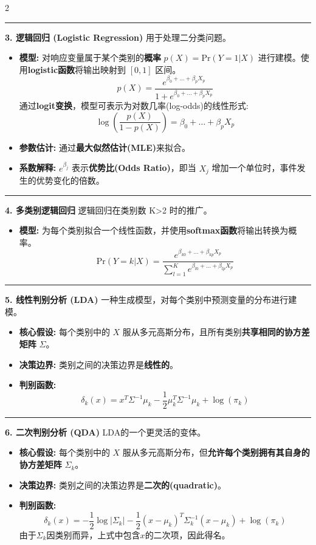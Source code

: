 \documentclass[9pt,a4paper]{article} %
\newcommand{\mysection}[1]{\vspace{0.5em}\hrule\vspace{0.3em}\noindent\textbf{\large #1}\vspace{0.1em}}
\begin{document}
\begin{multicols}{2}
\begin{itemize}
\mysection{3. 逻辑回归 (Logistic Regression)}
用于处理二分类问题。
\begin{itemize}
    \item \textbf{模型:} 对响应变量属于某个类别的\textbf{概率} $p(X) = \text{Pr}(Y=1|X)$ 进行建模。使用\textbf{logistic函数}将输出映射到 $[0, 1]$ 区间。
    $$ p(X) = \frac{e^{\beta_0 + \dots + \beta_pX_p}}{1 + e^{\beta_0 + \dots + \beta_pX_p}} $$
    通过\textbf{logit变换}，模型可表示为对数几率(log-odds)的线性形式:
    $$ \log\left(\frac{p(X)}{1-p(X)}\right) = \beta_0 + \dots + \beta_pX_p $$
    \item \textbf{参数估计:} 通过\textbf{最大似然估计(MLE)}来拟合。
    \item \textbf{系数解释:} $e^{\beta_j}$ 表示\textbf{优势比(Odds Ratio)}，即当 $X_j$ 增加一个单位时，事件发生的优势变化的倍数。
\end{itemize}

\mysection{4. 多类别逻辑回归}
逻辑回归在类别数 K>2 时的推广。
\begin{itemize}
    \item \textbf{模型:} 为每个类别拟合一个线性函数，并使用\textbf{softmax函数}将输出转换为概率。
    $$ \text{Pr}(Y=k|X) = \frac{e^{\beta_{k0} + \dots + \beta_{kp}X_p}}{\sum_{l=1}^{K} e^{\beta_{l0} + \dots + \beta_{lp}X_p}} $$
\end{itemize}

\mysection{5. 线性判别分析 (LDA)}
一种生成模型，对每个类别中预测变量的分布进行建模。
\begin{itemize}
    \item \textbf{核心假设:} 每个类别中的 $X$ 服从多元高斯分布，且所有类别\textbf{共享相同的协方差矩阵} $\Sigma$。
    \item \textbf{决策边界:} 类别之间的决策边界是\textbf{线性的}。
    \item \textbf{判别函数:}
    $$ \delta_k(x) = x^T\Sigma^{-1}\mu_k - \frac{1}{2}\mu_k^T\Sigma^{-1}\mu_k + \log(\pi_k) $$
\end{itemize}

\mysection{6. 二次判别分析 (QDA)}
LDA的一个更灵活的变体。
\begin{itemize}
    \item \textbf{核心假设:} 每个类别中的 $X$ 服从多元高斯分布，但\textbf{允许每个类别拥有其自身的协方差矩阵} $\Sigma_k$。
    \item \textbf{决策边界:} 类别之间的决策边界是\textbf{二次的(quadratic)}。
    \item \textbf{判别函数:}
    $$ \delta_k(x) = -\frac{1}{2}\log|\Sigma_k| - \frac{1}{2}(x-\mu_k)^T\Sigma_k^{-1}(x-\mu_k) + \log(\pi_k) $$
    由于$\Sigma_k$因类别而异，上式中包含$x$的二次项，因此得名。
\end{itemize}


\end{itemize}
\end{multicols}
\end{document}
